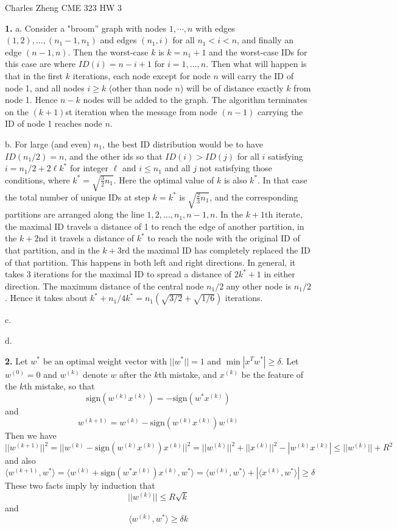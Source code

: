 \documentclass[11pt]{article}
\begin{document}
\newcommand{\tr}{\text{tr}}
\newcommand{\E}{\textbf{E}}
\newcommand{\diag}{\text{diag}}
\newcommand{\argmax}{\text{argmax}}
\newcommand{\Cov}{\text{Cov}}
\newcommand{\Var}{\text{Var}}
\newcommand{\sign}{\text{sign}}
\renewcommand{\thefootnote}{\fnsymbol{footnote}}

\begin{center}
\noindent Charles Zheng CME 323 HW 3
\end{center}

\noindent\textbf{1.}  a.  Consider a "broom'' graph with nodes
$1,\cdots, n$ with edges $(1, 2), \hdots, (n_1 - 1, n_1)$ and edges
$(n_1, i)$ for all $n_1 < i < n$, and finally an edge $(n-1, n)$.
Then the worst-case $k$ is $k = n_1 + 1$ and the worst-case IDs for
this case are where $ID(i) = n - i + 1$ for $i = 1,\hdots, n$.  Then
what will happen is that in the first $k$ iterations, each node except
for node $n$ will carry the ID of node 1, and all nodes $i \geq k$ (other
than node $n$) will be of distance exactly $k$ from node 1.  Hence $n-
k$ nodes will be added to the graph.  The algorithm terminates on the
$(k+1)$st iteration when the message from node $(n-1)$ carrying the ID
of node 1 reaches node $n$.

b.  For large (and even) $n_1$, the best ID distribution would be to have
$ID(n_1/2) = n$, and the other ids so that $ID(i) > ID(j)$ for all $i$
satisfying $i = n_1/2 + 2\ell k^*$ for integer $\ell$ and $i
\leq n_1$ and all $j$ not satisfying those conditions, where $k^* =
\sqrt{\frac{3}{2}n_1}$.  Here the optimal value of $k$ is also
$k^*$. In that case the total number of unique IDs at step $k = k^*$
is $\sqrt{\frac{2}{3} n_1}$, and the corresponding partitions are
arranged along the line $1, 2, \hdots, n_1, n-1, n$.  In the $k+1$th
iterate, the maximal ID travels a distance of 1 to reach the edge of
another partition, in the $k+2$nd it travels a distance of $k^*$ to
reach the node with the original ID of that partition, and in the
$k+3$rd the maximal ID has completely replaced the ID of that
partition.  This happens in both left and right directions.  In
general, it takes 3 iterations for the maximal ID to spread a distance
of $2k^* + 1$ in either direction.  The maximum distance of the
central node $n_1/2$ any other node is $n_1/2$.  Hence it
takes about $k^* + n_1/4k^* = n_1 (\sqrt{3/2} + \sqrt{1/6})$
iterations.

c.

d.


\noindent\textbf{2.}
Let $w^*$ be an optimal weight vector with $||w^*||=1$ and $\min |x^T w^*| \geq \delta$.
Let $w^{(0)} = 0$ and $w^{(k)}$ denote $w$ after the $k$th mistake, and $x^{(k)}$ be the feature of the $k$th mistake,
so that
\[
\sign(w^{(k)} x^{(k)}) = -\sign(w^* x^{(k)})
\]
and
\[
w^{(k+1)} = w^{(k)} - \sign(w^{(k)} x^{(k)}) w^{(k)}
\]
Then we have
\[
||w^{(k+1)}||^2 = ||w^{(k)} - \sign(w^{(k)} x^{(k)}) x^{(k)}||^2 = ||w^{(k)}||^2 + ||x^{(k)}||^2 - |w^{(k)} x^{(k)}| \leq ||w^{(k)}|| + R^2
\]
and also
\[
\langle w^{(k+1)}, w^* \rangle = \langle w^{(k)} +\sign(w^* x^{(k)})x^{(k)} , w^* \rangle = \langle w^{(k)}, w^* \rangle + |\langle x^{(k)}, w^* \rangle| \geq \delta
\]
These two facts imply by induction that
\[
||w^{(k)}|| \leq R\sqrt{k}
\]
and
\[
\langle w^{(k)}, w^* \rangle \geq \delta k
\]
\end{document}
